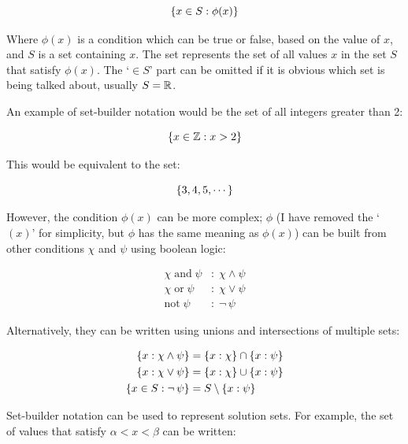         \begin{equation}
            \left\{x\in S:\phi(x)\right\}
        \end{equation}

        Where $\phi(x)$ is a condition which can be true or false, based on the value of $x$, and $S$ is a set containing $x$.
        The set represents the set of all values $x$ in the set $S$ that satisfy $\phi(x)$.
        The `$\in S$' part can be omitted if it is obvious which set is being talked about, usually $S=\operatorname{\mathbb{R}}$.
        
        An example of set-builder notation would be the set of all integers greater than 2:

        \begin{equation}
            \left\{x\in\operatorname{\mathbb{Z}}:x>2\right\}
        \end{equation}

        This would be equivalent to the set:
        
        \begin{equation}
            \left\{3,4,5,\cdots\right\}
        \end{equation}

        However, the condition $\phi(x)$ can be more complex; $\phi$ (I have removed the `$(x)$' for simplicity, but $\phi$ has the same meaning as $\phi(x)$) can be built from other conditions $\chi$ and $\psi$ using boolean logic:

        \begin{align}
            \chi\;\text{and}\;\psi&:\;\chi\wedge\psi \\
            \chi\;\text{or}\;\psi&:\;\chi\vee\psi \\
            \text{not}\;\psi&:\;\lnot\,\psi
        \end{align}

        Alternatively, they can be written using unions and intersections of multiple sets:

        \begin{align}
            \left\{x:\chi\wedge\psi\right\}&=\left\{x:\chi\right\}\cap\left\{x:\psi\right\} \\
            \left\{x:\chi\vee\psi\right\}&=\left\{x:\chi\right\}\cup\left\{x:\psi\right\} \\
            \left\{x\in S:\lnot\,\psi\right\}&=S\setminus\left\{x:\psi\right\}
        \end{align}

        Set-builder notation can be used to represent solution sets.
        For example, the set of values that satisfy $\alpha<x<\beta$ can be written:


